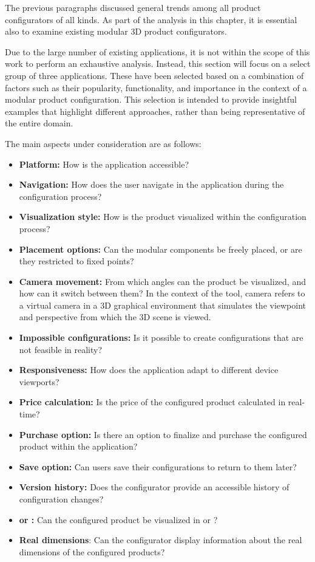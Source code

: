 The previous paragraphs discussed general trends among all product configurators of all kinds. As part of the analysis in this chapter, it is essential also to examine existing modular 3D product configurators. 

Due to the large number of existing applications, it is not within the scope of this work to perform an exhaustive analysis. Instead, this section will focus on a select group of three applications. These have been selected based on a combination of factors such as their popularity, functionality, and importance in the context of a modular product configuration. This selection is intended to provide insightful examples that highlight different approaches, rather than being representative of the entire domain.

\noindent The main aspects under consideration are as follows:\nopagebreak
\begin{itemize}[label=\rectanglebullet]
    \item \textbf{Platform:} How is the application accessible?
    \item \textbf{Navigation:} How does the user navigate in the application during the configuration process?
    \item \textbf{Visualization style:} How is the product visualized within the configuration process?
    \item \textbf{Placement options:} Can the modular components be freely placed, or are they restricted to fixed points?
    \item \textbf{Camera movement:} From which angles can the product be visualized, and how can it switch between them? In the context of the tool, camera refers to a virtual camera in a 3D graphical environment that simulates the viewpoint and perspective from which the 3D scene is viewed.
    \item \textbf{Impossible configurations:} Is it possible to create configurations that are not feasible in reality?
    \item \textbf{Responsiveness:} How does the application adapt to different device viewports?
    \item \textbf{Price calculation:} Is the price of the configured product calculated in real-time?
    \item \textbf{Purchase option:} Is there an option to finalize and purchase the configured product within the application?
    \item \textbf{Save option:} Can users save their configurations to return to them later?
    \item \textbf{Version history:} Does the configurator provide an accessible history of configuration changes?
    \item \textbf{ or :} Can the configured product be visualized in  or ?
    \item \textbf{Real dimensions}: Can the configurator display information about the real dimensions of the configured products? 
\end{itemize}
